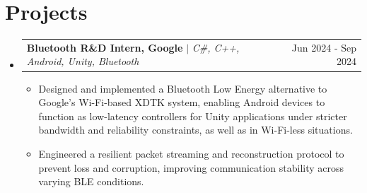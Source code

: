 \documentclass[letterpaper,11pt]{article}
\makeatletter
\newcommand{\resumeItem}[1]{
  \item\small{
    {#1 \vspace{-2pt}}
  }
}
\newcommand{\resumeProjectHeading}[2]{
    \item
    \begin{tabular*}{0.97\textwidth}{l@{\extracolsep{\fill}}r}
      \small#1 & #2 \\
    \end{tabular*}\vspace{-7pt}
}
\newcommand{\resumeSubHeadingListStart}{\begin{itemize}[leftmargin=0.15in, label={}]}
\newcommand{\resumeSubHeadingListEnd}{\end{itemize}}
\newcommand{\resumeItemListStart}{\begin{itemize}}
\newcommand{\resumeItemListEnd}{\end{itemize}\vspace{-5pt}}
\makeatother
\begin{document}
\section{Projects}
    \resumeSubHeadingListStart
    \resumeProjectHeading
          {\textbf{Bluetooth R\&D Intern, Google} $|$ \emph{C\#, C++, Android, Unity, Bluetooth}}{Jun 2024 - Sep 2024}
          \resumeItemListStart
            \resumeItem{Designed and implemented a Bluetooth Low Energy alternative to Google's Wi-Fi-based XDTK system, enabling Android devices to function as low-latency controllers for Unity applications under stricter bandwidth and reliability constraints, as well as in Wi-Fi-less situations.}
            \resumeItem{Engineered a resilient packet streaming and reconstruction protocol to prevent loss and corruption, improving communication stability across varying BLE conditions.}
          \resumeItemListEnd
    \resumeSubHeadingListEnd
\end{document}
